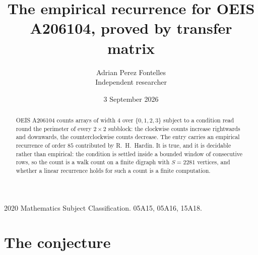 \documentclass[11pt,a4paper]{article}
\title{The empirical recurrence for OEIS A206104, proved by transfer matrix}
\author{Adrian Perez Fontelles\\ \small Independent researcher}
\date{3 September 2026}
\theoremstyle{plain}
\theoremstyle{definition}
\begin{document}
\maketitle

\begin{abstract}
OEIS A206104 counts arrays of width $4$ over $\{0,1,2,3\}$ subject to a condition read round the
perimeter of every $2\times2$ subblock: the clockwise counts increase rightwards and downwards, the counterclockwise counts decrease. The entry carries an empirical recurrence of
order $85$ contributed by R.~H.~Hardin. It is true, and it is decidable rather than
empirical: the condition is settled inside a bounded window of consecutive rows, so the
count is a walk count on a finite digraph with $S=2281$ vertices, and whether a linear
recurrence holds for such a count is a finite computation.
\end{abstract}

\noindent\small 2020 Mathematics Subject Classification. 05A15, 05A16, 15A18.\normalsize

\section{The conjecture}
\end{document}
